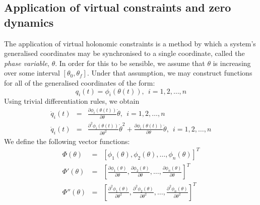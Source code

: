\subsection{Application of virtual constraints and zero dynamics}
The application of virtual holonomic constraints is a method by which a system's generalised coordinates may be synchronised to a single coordinate, called the \textit{phase variable}, $\theta$. In order for this to be sensible, we assume that $\theta$ is increasing over some interval $[\theta_0, \theta_f]$. Under that assumption, we may construct functions for all of the generalised coordinates of the form:
\begin{equation}
	q_i(t) = \phi_i\left(\theta(t)\right), ~~ i = 1,2,\ldots,n
\end{equation}
Using trivial differentiation rules, we obtain
\begin{eqnarray}
	\dot{q}_i(t) &=& \frac{\partial\phi_i\left(\theta(t)\right)}{\partial\theta}\dot{\theta},
						~~i = 1,2,\ldots,n \\
	\ddot{q}_i(t) &=& \frac{\partial^2\phi_i\left(\theta(t)\right)}{\partial\theta^2}\dot{\theta}^2 +
						\frac{\partial\phi_i\left(\theta(t)\right)}{\partial\theta}\ddot{\theta},
						~~i = 1,2,\ldots,n
\end{eqnarray}
We define the following vector functions:
\begin{eqnarray}
	\Phi\left(\theta\right) &=& \left[ \phi_1\left(\theta\right), \phi_2\left(\theta\right), \ldots,
	\phi_n\left(\theta\right)\right]^T \\
	\Phi'\left(\theta\right) &=& \left[ \frac{\partial\phi_1\left(\theta\right)}{\partial\theta},
	\frac{\partial\phi_2\left(\theta\right)}{\partial\theta}, \ldots ,
	\frac{\partial\phi_n\left(\theta\right)}{\partial\theta} \right]^T \\
	\Phi''\left(\theta\right) &=& \left[ \frac{\partial^2\phi_1\left(\theta\right)}{\partial\theta^2},
	\frac{\partial^2\phi_2\left(\theta\right)}{\partial\theta^2}, \ldots ,
	\frac{\partial^2\phi_n\left(\theta\right)}{\partial\theta^2} \right]^T
\end{eqnarray} ~\\

